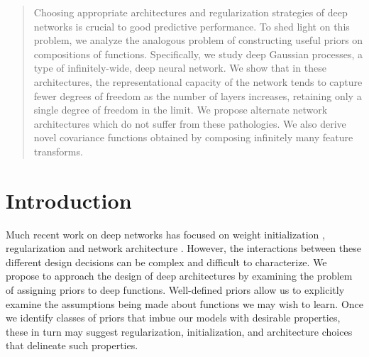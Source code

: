\documentclass[twoside]{article}
\newcommand{\sectiondist}{}
\begin{document}
\twocolumn[
\aistatstitle{Avoiding pathologies in very deep neural networks}
\aistatsauthor{ David Duvenaud \And Oren Rippel \And Ryan Adams \And Zoubin Ghahramani }
\aistatsaddress{ 
University of Cambridge \And %
M.I.T., Harvard University \And %
Harvard University \And %
University of Cambridge} %
]


\begin{abstract}
Choosing appropriate architectures and regularization strategies of deep networks is crucial to good predictive performance.  To shed light on this problem, we analyze the analogous problem of constructing useful priors on compositions of functions.  Specifically, we study deep Gaussian processes, a type of infinitely-wide, deep neural network.  We show that in these architectures, the representational capacity of the network tends to capture fewer degrees of freedom as the number of layers increases, retaining only a single degree of freedom in the limit.  We propose alternate network architectures which do not suffer from these pathologies.  We also derive novel covariance functions obtained by composing infinitely many feature transforms.
\end{abstract}

\section{Introduction}
\sectiondist

Much recent work on deep networks has focused on weight initialization \citep{martens2010deep}, regularization \citep{lee2007sparse} and network architecture \citep{gens2013learning}.
However, the interactions between these different design decisions can be complex and difficult to characterize. We propose to approach the design of deep architectures by examining the problem of assigning priors to deep functions.
Well-defined priors allow us to explicitly examine the assumptions being made about functions we may wish to learn.
 Once we identify classes of priors that imbue our models with desirable properties, these in turn may suggest regularization, initialization, and architecture choices that delineate such properties.
\end{document}
